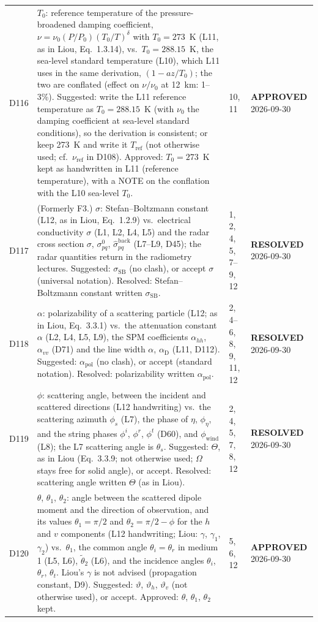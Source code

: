 \documentclass[11pt, oneside]{article}
\newcommand{\approved}{\textbf{APPROVED}}
\newcommand{\resolved}{\textbf{RESOLVED}}
\begin{document}
\begin{longtable}{l >{\raggedright\arraybackslash}p{} l l}
D116 & $T_0$: reference temperature of the pressure-broadened damping coefficient, $\nu = \nu_0(P/P_0)(T_0/T)^\delta$ with $T_0 = 273$~K (L11, as in Liou, Eq.~1.3.14), vs.\ $T_0 = 288.15$~K, the sea-level standard temperature (L10), which L11 uses in the same derivation, $(1 - az/T_0)$; the two are conflated (effect on $\nu/\nu_0$ at 12~km: 1--3\%). Suggested: write the L11 reference temperature as $T_0 = 288.15$~K (with $\nu_0$ the damping coefficient at sea-level standard conditions), so the derivation is consistent; or keep 273~K and write it $T_\mathrm{ref}$ (not otherwise used; cf.\ $\nu_\mathrm{ref}$ in D108). Approved: $T_0 = 273$~K kept as handwritten in L11 (reference temperature), with a NOTE on the conflation with the L10 sea-level $T_0$. & 10, 11 & \approved{} 2026-09-30 \\
D117 & (Formerly F3.) $\sigma$: Stefan--Boltzmann constant (L12, as in Liou, Eq.~1.2.9) vs.\ electrical conductivity $\sigma$ (L1, L2, L4, L5) and the radar cross section $\sigma$, $\sigma^0_{pq}$, $\hat{\sigma}^\mathrm{back}_{pq}$ (L7--L9, D45); the radar quantities return in the radiometry lectures. Suggested: $\sigma_\mathrm{SB}$ (no clash), or accept $\sigma$ (universal notation). Resolved: Stefan--Boltzmann constant written $\sigma_\mathrm{SB}$. & 1, 2, 4, 5, 7--9, 12 & \resolved{} 2026-09-30 \\
D118 & $\alpha$: polarizability of a scattering particle (L12; as in Liou, Eq.~3.3.1) vs.\ the attenuation constant $\alpha$ (L2, L4, L5, L9), the SPM coefficients $\alpha_{hh}$, $\alpha_{vv}$ (D71) and the line width $\alpha$, $\alpha_\mathrm{D}$ (L11, D112). Suggested: $\alpha_\mathrm{pol}$ (no clash), or accept (standard notation). Resolved: polarizability written $\alpha_\mathrm{pol}$. & 2, 4--6, 8, 9, 11, 12 & \resolved{} 2026-09-30 \\
D119 & $\phi$: scattering angle, between the incident and scattered directions (L12 handwriting) vs.\ the scattering azimuth $\phi_s$ (L7), the phase of $\eta$, $\phi_\eta$, and the string phases $\phi^i$, $\phi^r$, $\phi^t$ (D60), and $\phi_\mathrm{wind}$ (L8); the L7 scattering angle is $\theta_s$. Suggested: $\Theta$, as in Liou (Eq.~3.3.9; not otherwise used; $\Omega$ stays free for solid angle), or accept. Resolved: scattering angle written $\Theta$ (as in Liou). & 2, 4, 5, 7, 8, 12 & \resolved{} 2026-09-30 \\
D120 & $\theta$, $\theta_1$, $\theta_2$: angle between the scattered dipole moment and the direction of observation, and its values $\theta_1 = \pi/2$ and $\theta_2 = \pi/2 - \phi$ for the $h$ and $v$ components (L12 handwriting; Liou: $\gamma$, $\gamma_1$, $\gamma_2$) vs.\ $\theta_1$, the common angle $\theta_i = \theta_r$ in medium 1 (L5, L6), $\tilde{\theta}_2$ (L6), and the incidence angles $\theta_i$, $\theta_r$, $\theta_t$. Liou's $\gamma$ is not advised (propagation constant, D9). Suggested: $\vartheta$, $\vartheta_h$, $\vartheta_v$ (not otherwise used), or accept. Approved: $\theta$, $\theta_1$, $\theta_2$ kept. & 5, 6, 12 & \approved{} 2026-09-30 \\

\end{longtable}
\end{document}

